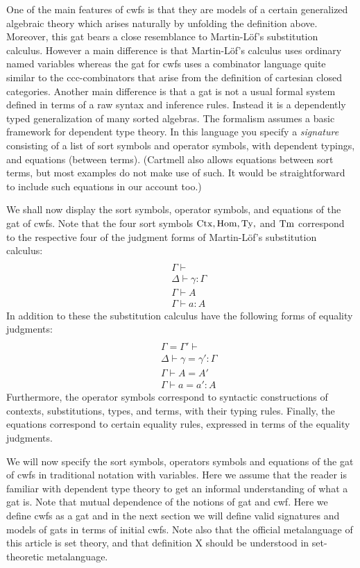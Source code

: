 \documentclass{lmcs}
\def\Ctx{\mathrm{Ctx}}
\def\Hom{\mathrm{Hom}}
\begin{document}
One of the main features of cwfs is that they are models of a certain generalized algebraic theory which arises naturally by unfolding the definition above. Moreover, this gat bears a close resemblance to Martin-Löf's substitution calculus. However a main difference is that Martin-Löf's calculus uses ordinary named variables whereas the gat for cwfs uses a combinator language quite similar to the ccc-combinators that arise from the definition of cartesian closed categories. Another main difference is that a gat is not a usual formal system defined in terms of a raw syntax and inference rules. Instead it is a dependently typed generalization of many sorted algebras. The formalism assumes a basic framework for dependent type theory. In this language you specify a {\em signature} consisting of a list of sort symbols and operator symbols, with dependent typings, and equations (between terms). (Cartmell \cite{cartmell:phd,cartmell:apal} also allows equations between sort terms, but most examples do not make use of such. It would be straightforward to include such equations in our account too.) 

We shall now display the sort symbols, operator symbols, and equations of the gat of cwfs. Note that the four sort symbols $\Ctx, \Hom, \Ty,$ and $\mathrm{Tm}$ correspond to the respective four of the judgment forms of Martin-Löf's substitution calculus:
\begin{eqnarray*}
\\&&\Gamma \vdash
\\&&\Delta \vdash \gamma : \Gamma
\\&&\Gamma \vdash A
\\&&\Gamma \vdash a : A
\end{eqnarray*}
In addition to these the substitution calculus have the following forms of equality judgments:
\begin{eqnarray*}
\\&&\Gamma = \Gamma' \vdash
\\&&\Delta \vdash \gamma = \gamma' : \Gamma
\\&&\Gamma \vdash A = A'
\\&&\Gamma \vdash a = a' : A
\end{eqnarray*}
Furthermore, the operator symbols correspond to syntactic constructions of contexts, substitutions, types, and terms, with their typing rules. Finally, the equations correspond to certain equality rules, expressed in terms of the equality judgments. 

We will now specify the sort symbols, operators symbols and equations of the gat of cwfs in traditional notation with variables. Here we assume that the reader is familiar with dependent type theory to get an informal understanding of what a gat is. Note that mutual dependence of the notions of gat and cwf. Here we define cwfs as a gat and in the next section we will define valid signatures and models of gats in terms of initial cwfs. Note also that the official metalanguage of this article is set theory, and that definition X should be understood in set-theoretic metalanguage.
\end{document}
